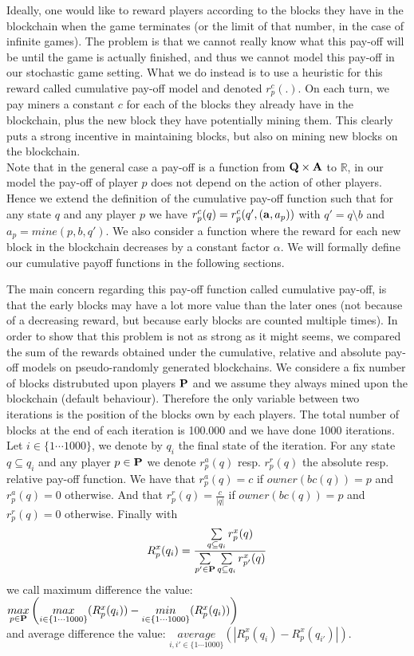 \begin{myex}
\end{myex}

Ideally, one would like to reward players according to the blocks they have in the blockchain when the game terminates (or the limit of that number, in the case of infinite games). The problem is that we cannot really know what this pay-off will be until the game is actually finished, and thus we cannot model this pay-off in our stochastic game setting.
What we do instead is to use a heuristic for this reward called cumulative pay-off model and denoted $r_p^c(.)$. On each turn, we pay miners a constant $c$ for each of the blocks they already have in the blockchain, plus the new block they have potentially mining them. This clearly puts a strong incentive in maintaining blocks, but also on mining new blocks on the blockchain.
\\Note that in the general case a pay-off is a function from $\mathbf{Q} \times \mathbf{A}$ to $\mathbb{R}$, in our model the pay-off of player $p$ does not depend on the action of other players. Hence we extend the definition of the cumulative pay-off function such that for any state $q$ and any player $p$ we have $r_p^c(q) = r_p^c(q',(\mathbf{a},a_p))$ with $q' = q \setminus b$ and $a_p = mine(p,b,q')$. We also consider a function where the reward for each new block in the blockchain decreases by a constant factor $\alpha$. We will formally define our cumulative payoff functions in the following sections.


The main concern regarding this pay-off function called cumulative pay-off, is that the early blocks may have a lot more value than the later ones (not because of a decreasing reward, but because early blocks are counted multiple times).
In order to show that this problem is not as strong as it might seems, we compared the sum of the rewards obtained under the cumulative, relative \cite{} and absolute \cite{} pay-off models on pseudo-randomly generated  blockchains. We considere a fix number of blocks distrubuted upon players $\mathbf{P}$ and we assume they always mined upon the blockchain (default behaviour). Therefore the only variable between two iterations is the position of the blocks own by each players. The total number of blocks at the end of each iteration is 100.000 and we have done 1000 iterations. Let $i \in \{1\cdots 1000\}$, we denote by $q_i$ the final state of the iteration. For any state $q \subseteq q_i$ and any player $p \in \mathbf{P}$ we denote $r_p^a(q)$ resp. $r_p^r(q)$ the absolute resp. relative pay-off function. We have that $r_p^a(q) = c$ if $owner(bc(q)) = p$ and $r_p^a(q) = 0$ otherwise. And that $r_p^r(q) = \frac{c}{|q|}$ if $owner(bc(q)) = p$ and $r_p^r(q) = 0$ otherwise. Finally with $$R_p^x(q_i) = \frac{\sum\limits_{q \subseteq q_i} r_p^x(q)}{\sum\limits_{p' \in \mathbf{P}}\sum\limits_{q \subseteq q_i} r_{p'}^x(q)} $$ we call maximum difference the value:\\ $\underset{p \in \mathbf{P}}{max}\left(\underset{{i \in \{1 \cdots 10
00\}}}{max}(R_p^x(q_i)) - \underset{{i \in \{1 \cdots 10
00\}}}{min}(R_p^x(q_i))\right)$\\and average difference the value: $\underset{{i,i' \in \{1 \cdots 10
00\}}}{average}(|R_p^x(q_i) - R_p^x(q_{i'})|) $.

